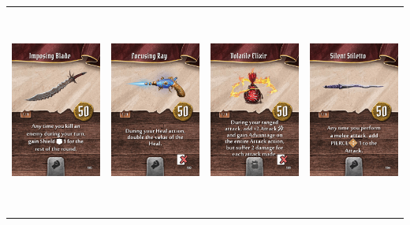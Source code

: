\documentclass{minimal}
\begin{document}
{\begin{longtable}{llll}
\includegraphics[width=44mm,height=68mm]{./64-151/gh-134-imposing-blade.png} &
\includegraphics[width=44mm,height=68mm]{./64-151/gh-135-focusing-ray.png} &
\includegraphics[width=44mm,height=68mm]{./64-151/gh-136-volatile-elixir.png} &
\includegraphics[width=44mm,height=68mm]{./64-151/gh-137-silent-stiletto.png}\\ 

\end{longtable}}
\end{document}
